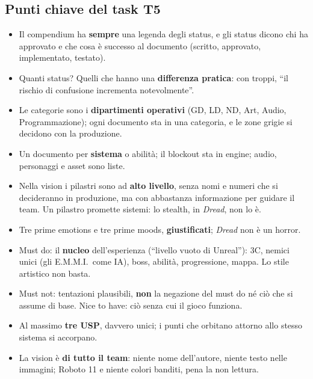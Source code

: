 \subsection{Punti chiave del task T5}
\label{rv:t5:sec:punti-chiave}

\begin{itemize}
  \item Il compendium ha \textbf{sempre} una legenda degli status, e gli
        status dicono chi ha approvato e che cosa è successo al documento
        (scritto, approvato, implementato, testato).
  \item Quanti status? Quelli che hanno una \textbf{differenza pratica}: con
        troppi, ``il rischio di confusione incrementa notevolmente''.
  \item Le categorie sono i \textbf{dipartimenti operativi} (GD, LD, ND, Art,
        Audio, Programmazione); ogni documento sta in una categoria, e le
        zone grigie si decidono con la produzione.
  \item Un documento per \textbf{sistema} o abilità; il blockout sta in
        engine; audio, personaggi e asset sono liste.
  \item Nella vision i pilastri sono ad \textbf{alto livello}, senza nomi e
        numeri che si decideranno in produzione, ma con abbastanza
        informazione per guidare il team. Un pilastro promette sistemi: lo
        stealth, in \emph{Dread}, non lo è.
  \item Tre prime emotions e tre prime moods, \textbf{giustificati};
        \emph{Dread} non è un horror.
  \item Must do: il \textbf{nucleo} dell'esperienza (``livello vuoto di
        Unreal''): 3C, nemici unici (gli E.M.M.I.\ come IA), boss, abilità,
        progressione, mappa. Lo stile artistico non basta.
  \item Must not: tentazioni plausibili, \textbf{non} la negazione del must
        do né ciò che si assume di base. Nice to have: ciò senza cui il
        gioco funziona.
  \item Al massimo \textbf{tre USP}, davvero unici; i punti che orbitano
        attorno allo stesso sistema si accorpano.
  \item La vision è \textbf{di tutto il team}: niente nome dell'autore,
        niente testo nelle immagini; Roboto 11 e niente colori banditi, pena
        la non lettura.
\end{itemize}

